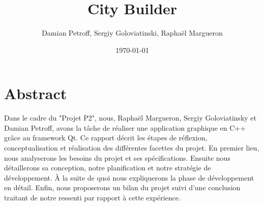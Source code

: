 \documentclass[a4paper,10pt,openany,oneside]{report}
\begin{document}
\begin{titlepage}
\title{City Builder}
\author{Damian Petroff, Sergiy Goloviatinski, Raphaël Margueron}
\date{\today}
\maketitle
\end{titlepage}

\thispagestyle{empty}
\pagebreak
\thispagestyle{empty}
\chapter*{Abstract}
\thispagestyle{empty}
Dans le cadre du "Projet P2", nous, Raphaël Margueron, Sergiy Goloviatinsky et Damian Petroff, avons la tâche de réaliser une application graphique en C++ grâce au framework Qt. 
Ce rapport décrit les étapes de réflexion, conceptualisation et réalisation des différentes facettes du projet. En premier lieu, nous analyserons les besoins du projet et ses spécifications. Ensuite nous détaillerons sa conception, notre planification et notre stratégie de développement. À la suite de quoi nous expliquerons la phase de développement en détail. Enfin, nous proposerons un bilan du projet suivi d'une conclusion traitant de notre ressenti par rapport à cette expérience.
\pagebreak
\thispagestyle{empty}
\tableofcontents
\thispagestyle{empty}
\end{document}
